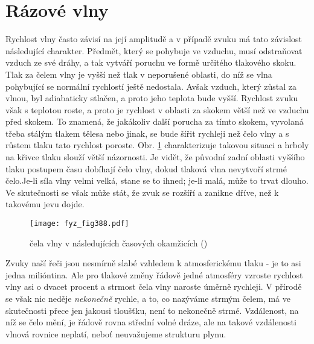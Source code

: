 {\section{Rázové vlny}\label{fyz:IchapLIsecII}
  Rychlost vlny často závisí na její amplitudě a v případě zvuku má tato závislost následující 
  charakter. Předmět, který se pohybuje ve vzduchu, musí odstraňovat vzduch ze své dráhy, a tak 
  vytváří poruchu ve formě určitého tlakového skoku. Tlak za čelem vlny je vyšší než tlak v 
  neporušené oblasti, do níž se vlna pohybující se normální rychlostí ještě nedostala. Avšak 
  vzduch, který zůstal za vlnou, byl adiabaticky stlačen, a proto jeho teplota bude vyšší. Rychlost 
  zvuku však s teplotou roste, a proto je rychlost v oblasti za skokem větší než ve vzduchu před 
  skokem. To znamená, že jakákoliv další porucha za tímto skokem, vyvolaná třeba stálým tlakem 
  tělesa nebo jinak, se bude šířit rychleji než čelo vlny a s růstem tlaku tato rychlost poroste. 
  Obr. \ref{fyz:fig388} charakterizuje takovou situaci a hrboly na křivce tlaku slouží větší 
  názornosti. Je vidět, že původní zadní oblasti vyššího tlaku postupem času dobíhají čelo vlny, 
  dokud tlaková vlna nevytvoří strmé čelo.Je-li síla vlny velmi velká, stane se to ihned; je-li 
  malá, může to trvat dlouho. Ve skutečnosti se však může stát, že zvuk se rozšíří a zanikne dříve, 
  než k takovému jevu dojde.
  \begin{figure}[ht!] %
    \centering
    \texttt{[image: fyz\_fig388.pdf]}
    \caption{ čela vlny v následujících časových okamžicích
             (\cite[s.~688]{Feynman01})}
    \label{fyz:fig388}
  \end{figure}
  
  Zvuky naší řeči jsou nesmírně slabé vzhledem k atmosferickému tlaku - je to asi jedna milióntina. 
  Ale pro tlakové změny řádově jedné atmosféry vzroste rychlost vlny asi o dvacet procent a strmost 
  čela vlny naroste úměrně rychleji. V přírodě se však nic neděje \emph{nekonečně} rychle, a to, co 
  nazýváme strmým čelem, má ve skutečnosti přece jen jakousi tloušťku, není to nekonečně strmé. 
  Vzdálenost, na níž se čelo mění, je řádově rovna střední volné dráze, ale na takové vzdálenosti 
  vlnová rovnice neplatí, neboť neuvažujeme strukturu plynu.
  
}

